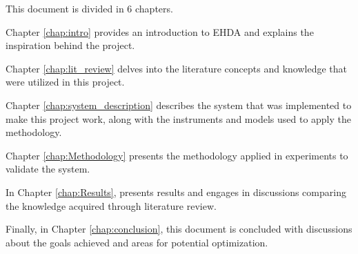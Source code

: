 This document is divided in 6 chapters. 

Chapter \ref{chap:intro} provides an introduction to EHDA and explains the inspiration behind the project.

Chapter \ref{chap:lit_review} delves into the literature concepts and knowledge that were utilized in this project.

Chapter \ref{chap:system_description} describes the system that was implemented to make this project work, along with the instruments and models used to apply the methodology.

Chapter \ref{chap:Methodology} presents the methodology applied in experiments to validate the system.

In Chapter \ref{chap:Results}, presents results and engages in discussions comparing the knowledge acquired through literature review.

Finally, in Chapter \ref{chap:conclusion}, this document is concluded with discussions about the goals achieved and areas for potential optimization.